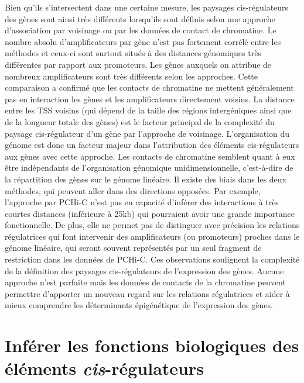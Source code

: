 Bien qu’ils s’intersectent dans une certaine mesure, les paysages \gls{cis}-régulateurs des gènes sont ainsi très différents lorsqu’ils sont définis selon une approche d’association par voisinage ou par les données de contact de chromatine. Le nombre absolu d’\glspl{amplificateur} par gène n’est pas fortement corrélé entre les méthodes et ceux-ci sont surtout situés à des distances génomiques très différentes par rapport aux promoteurs. Les gènes auxquels on attribue de nombreux \glspl{amplificateur} sont très différents selon les approches. Cette comparaison a confirmé que les contacts de chromatine ne mettent généralement pas en interaction les gènes et les \glspl{amplificateur} directement voisins. La distance entre les \acrshort{TSS} voisins (qui dépend de la taille des régions intergéniques ainsi que de la longueur totale des gènes) est le facteur principal de la complexité du paysage \gls{cis}-régulateur d’un gène par l’approche de voisinage. L’organisation du génome est donc un facteur majeur dans l’attribution des éléments \gls{cis}-régulateurs aux gènes avec cette approche. Les contacts de chromatine semblent quant à eux être indépendants de l’organisation génomique unidimensionnelle, c’est-à-dire de la répartition des gènes sur le génome linéaire. Il existe des biais dans les deux méthodes, qui peuvent aller dans des directions opposées. Par exemple, l’approche par \gls{PCHi-C} n’est pas en capacité d’inférer des interactions à très courtes distances (inférieure à 25kb) qui pourraient avoir une grande importance fonctionnelle. De plus, elle ne permet pas de distinguer avec précision les relations régulatrices qui font intervenir des \glspl{amplificateur} (ou promoteurs) proches dans le génome linéaire, qui seront souvent représentés par un seul fragment de restriction dans les données de PCHi-C. Ces observations soulignent la complexité de la définition des paysages \gls{cis}-régulateurs de l’expression des gènes. Aucune approche n'est parfaite mais les données de contacts de la chromatine peuvent permettre d’apporter un nouveau regard sur les relations régulatrices et aider à mieux comprendre les déterminants épigénétique de l’expression des gènes. 


\section{Inférer les fonctions biologiques des éléments \textit{cis}-régulateurs}
\label{sec:inferer-fonction}

